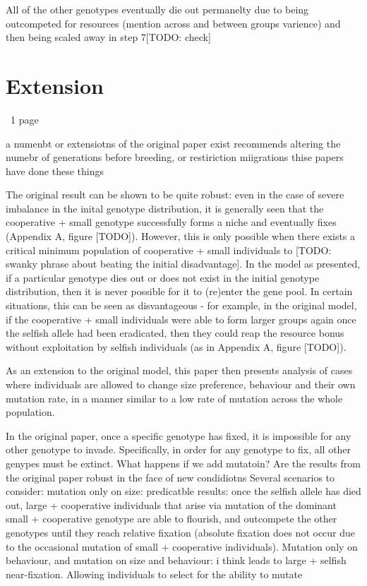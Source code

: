 \documentclass[11pt]{article}
\begin{document}
All of the other genotypes eventually die out permanelty due to being outcompeted for resources (mention across and between groups varience) and then being scaled away in step 7[TODO: check]
\clearpage
\section{Extension}
~1 page

a numenbt or extensiotns of the original paper exist
\citet{thesis} recommends altering the numebr of generations before breeding, or restiriction miigrations
thise papers have done these things


The original result can be shown to be quite robust: even in the case of severe imbalance in the inital genotype distribution, it is generally seen that the cooperative + small genotype successfully forms a niche and eventually fixes (Appendix A, figure [TODO]). However, this is only possible when there exists a critical minimum population of cooperative + small individuals to [TODO: swanky phrase about beating the initial disadvantage]. In the model as presented, if a particular genotype dies out or does not exist in the initial genotype distribution, then it is never possible for it to (re)enter the gene pool. In certain situations, this can be seen as disvantageous - for example, in the original model, if the cooperative + small individuals were able to form larger groups again once the selfish allele had been eradicated, then they could reap the resource bonus without exploitation by selfish individuals (as in Appendix A, figure [TODO]).

As an extension to the original model, this paper then presents analysis of cases where individuals are allowed to change size preference, behaviour and their own mutation rate, in a manner similar to a low rate of mutation across the whole population.

In the original paper, once a specific genotype has fixed, it is impossible for any other genotype to invade. Specifically, in order for any genotype to fix, all other genypes must be extinct.
What happens if we add mutatoin?
Are the results from the original paper robust in the face of new condidiotns
Several scenarios to consider:
 mutation only on size: predicatble results: once the selfish allele has died out, large + cooperative individuals that arise via mutation of the dominant small + cooperative genotype are able to flourish, and outcompete the other genotypes until they reach relative fixation (absolute fixation does not occur due to the occasional mutation of small + cooperative individuals).
 Mutation only on behaviour, and mutation on size and behaviour: i think leads to large + selfish near-fixation.
 Allowing individuals to select for the ability to mutate
\end{document}
